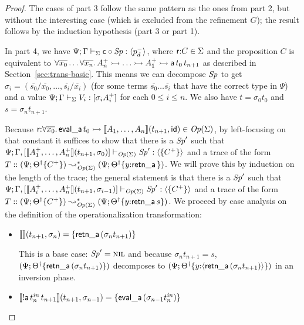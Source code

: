 \begin{proof}
The cases of part 3 follow the same pattern as the ones from part 2, but
without the interesting case (which is excluded from the refinement $G$);
the result follows by the induction hypothesis (part 3 or part 1). 

In part 4, we have ${\Psi}; {\Gamma} \vdash_{\Sigma} {{\sf
    c} \circ {{\it Sp}}} : {\langle {p^-_d} \rangle}$, where ${\sf r}{:}C \in \Sigma$ and the
proposition $C$ is equivalent to
$\forall{\overline{x_0}}\ldots\forall{\overline{x_n}}.\, A^+_n \rightarrowtail
\ldots \rightarrowtail A^+_1 \rightarrowtail {\sf a}\,t_0\,t_{n+1}$ as described in
Section~\ref{sec:trans-basic}. This means we can decompose ${\it Sp}$ to
get $\sigma_i = (\overline{s_0}/\overline{x_0},\ldots,
\overline{s_i}/\overline{x_i})$ (for some terms $\overline{s_0} \ldots
\overline{s_i}$ that have the correct type in $\Psi$) and a value
${\Psi}; {\Gamma} \vdash_{\Sigma} {V_i} : {[\sigma_i{A^+_i}]}$ for each $0 \leq
i \leq n$. We also have $t = \sigma_0{t_0}$ and $s = \sigma_n{t_{n+1}}$.

Because 
${\sf r}{:}\forall\overline{x_0}.\,{\sf eval\_a}\,t_0 \rightarrowtail \llbracket {A_1, \ldots, A_n} \rrbracket({t_{n+1}},{{\sf id}}) \in {\it Op}({\Sigma})$, by left-focusing
on that constant
it suffices to show that there is a ${\it Sp}'$ such that 
${\Psi}; {\Gamma,[
\llbracket {A_1^+, \ldots, A_n^+} \rrbracket({t_{n+1}},{\sigma_0})
]} \vdash_{{\it Op}({\Sigma})} {{\it Sp}'} : {\langle {\{C^+\}} \rangle}$ and a trace of the form
$T :: (\Psi; {{{\Theta}^\dag}}\{{C^+}\}) \leadsto^*_{{\it Op}({\Sigma})}
 (\Psi; {{{\Theta}^\dag}}\{{y{:}{\sf retn\_a}\,}\})$. We will prove this
by induction on the length of the trace; the general statement is that
there is a ${\it Sp}'$ such that 
${\Psi}; {\Gamma,[
\llbracket {A_i^+, \ldots, A_n^+} \rrbracket({t_{n+1}},{\sigma_{i-1}})
]} \vdash_{{\it Op}({\Sigma})} {{\it Sp}'} : {\langle {\{C^+\}} \rangle}$ and a trace of the form
$T :: (\Psi; {{{\Theta}^\dag}}\{{C^+}\}) \leadsto^*_{{\it Op}({\Sigma})}
 (\Psi; {{{\Theta}^\dag}}\{{y{:}{\sf retn\_a}\,s}\})$. We proceed
by case analysis on the definition of the operationalization transformation:
\begin{itemize}
\item $\llbracket {} \rrbracket({t_{n+1}},{\sigma_n}) = \{ {\sf retn\_a}\,(\sigma_{n}{t_{n+1}}) \}$

  \bigskip
  This is a base case: ${\it Sp}' = \textsc{nil}$ and because $\sigma_n{t_{n+1}} = s$, 
  $(\Psi; {{{\Theta}^\dag}}\{{{\sf retn\_a}\,(\sigma_{n}{t_{n+1}})}\})$ decomposes
  to $(\Psi; 
  {{{\Theta}^\dag}}\{{y{:}{\langle {{\sf retn\_a}\,(\sigma_{n}{t_{n+1}})} \rangle}}\})$
  in an inversion phase.
  \bigskip

\item $\llbracket {{!}{\sf a}\,t^{\it in}_n\,t_{n+1}} \rrbracket({t_{n+1}},{\sigma_{n-1}}) 
  = \{{\sf eval\_a}\,(\sigma_{n-1}{t^{\it in}_n})\}$


\end{itemize}
\end{proof}

